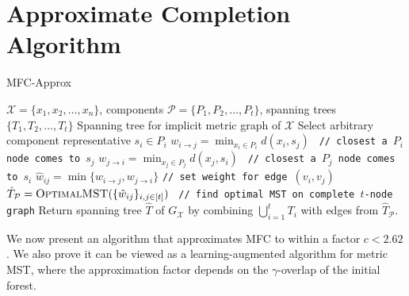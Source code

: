 \section{Approximate Completion Algorithm}
\label{sec:algs}
\begin{algorithm}[tb]
	\caption{\textsf{MFC-Approx}}
	\label{alg:mfcapprox}
	\begin{algorithmic}[5]
		 $\mathcal{X} = \{x_1, x_2, \hdots , x_n\}$, components $\mathcal{P} = \{P_1, P_2, \hdots, P_t\}$, spanning trees $\{T_1, T_2, \hdots, T_t\}$
		 Spanning tree for implicit metric graph of $\mathcal{X}$
		\State Select arbitrary component representative $s_i \in P_i$
		\EndFor
		\State $w_{i \rightarrow j} = \min_{x_i \in P_i} d(x_i, s_j)$  \quad \hfill \texttt{ // closest a $P_i$ node comes to $s_j$}
		\State $w_{j \rightarrow i} = \min_{x_j \in P_j} d(x_j, s_i)$ \quad \hfill  \texttt{ // closest a $P_j$ node comes to $s_i$}
		\State $\hat{w}_{ij} = \min \{w_{i \rightarrow j}, w_{j \rightarrow i}\}$ \quad  \hfill \texttt{// set weight for edge $(v_i, v_j)$} 
		\EndFor
		\EndFor
		\State $\hat{T}_{\mathcal{P}} = \textsc{OptimalMST}(\{\hat{w}_{ij}\}_{i,j \in [t]})$ \hfill \texttt{ // find optimal MST on complete $t$-node graph}
		\State Return spanning tree $\hat{T}$ of $G_\mathcal{X}$ by combining $\bigcup_{i=1}^t T_i$ with edges from $\hat{T}_{\mathcal{P}}$.
	\end{algorithmic}
\end{algorithm}

We now present an algorithm that approximates MFC to within a factor $c < 2.62$. We also prove it can be viewed as a learning-augmented algorithm for metric MST, where the approximation factor depends on the $\gamma$-overlap of the initial forest. 



